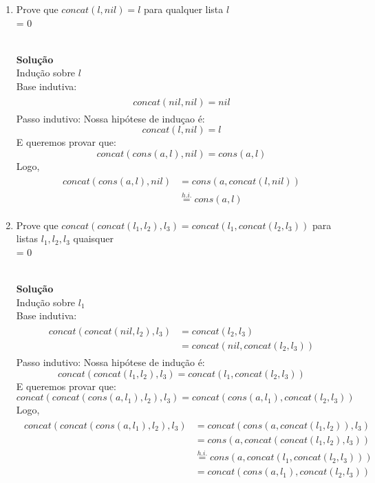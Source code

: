 \documentclass[a4paper]{article}
\newcommand{\answer}[2]{\ifnum#1= 0  {\color{blue} #2}\else \fi}
\begin{document}
\begin{enumerate}
\item Prove que $concat(l,nil) = l$ para qualquer lista $l$\\
  \answer{0}{\\ 
    {\bf Solução} \\
    Indução sobre $l$\\
    Base indutiva:
    \begin{align*}
      \begin{split}
        concat(nil,nil) = nil
      \end{split}
    \end{align*}
    Passo indutivo: Nossa hipótese de induçao é:
    $$ concat(l,nil) = l$$
    E queremos provar que:
    $$ concat(cons(a,l),nil) = cons(a,l)$$
    Logo,
    \begin{align*}
      \begin{split}
        concat(cons(a,l),nil) &= cons(a,concat(l,nil))\\
        &\stackrel{h.i.}{=}cons(a,l) 
      \end{split}
    \end{align*}
    
  }
  
\item Prove que $concat(concat(l_1,l_2),l_3) = concat(l_1,concat(l_2,l_3))$ para listas $l_1,l_2,l_3$ quaisquer\\
  \answer{0}{\\ 
    {\bf Solução} \\
    Indução sobre $l_1$\\
    Base indutiva:
    \begin{align*}
      \begin{split}
        concat(concat(nil,l_2),l_3) &= concat(l_2,l_3)\\
        &= concat(nil,concat(l_2,l_3))
      \end{split}
    \end{align*}
    Passo indutivo: Nossa hipótese de indução é:
    $$ concat(concat(l_1,l_2),l_3) = concat(l_1,concat(l_2,l_3))$$
    E queremos provar que:
    $$ concat(concat(cons(a,l_1),l_2),l_3) = concat(cons(a,l_1),concat(l_2,l_3))$$
    Logo,
    \begin{align*}
      \begin{split}
        concat(concat(cons(a,l_1),l_2),l_3) &= concat(cons(a,concat(l_1,l_2)),l_3)\\
        &= cons(a,concat(concat(l_1,l_2),l_3))\\
        &\stackrel{h.i.}{=}cons(a,concat(l_1,concat(l_2,l_3)))\\
        &=concat(cons(a,l_1),concat(l_2,l_3))
      \end{split}
    \end{align*}
    
}
\end{enumerate}
\end{document}
